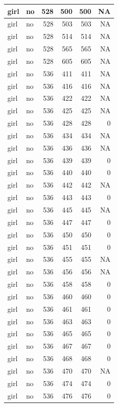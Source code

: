 \documentclass[man]{apa6}
\begin{document}
\begin{tabular}{l|l|r|r|r|r}
\hline
girl & no & 528 & 500 & 500 & NA\\
\hline
girl & no & 528 & 503 & 503 & NA\\
\hline
girl & no & 528 & 514 & 514 & NA\\
\hline
girl & no & 528 & 565 & 565 & NA\\
\hline
girl & no & 528 & 605 & 605 & NA\\
\hline
girl & no & 536 & 411 & 411 & NA\\
\hline
girl & no & 536 & 416 & 416 & NA\\
\hline
girl & no & 536 & 422 & 422 & NA\\
\hline
girl & no & 536 & 425 & 425 & NA\\
\hline
girl & no & 536 & 428 & 428 & 0\\
\hline
girl & no & 536 & 434 & 434 & NA\\
\hline
girl & no & 536 & 436 & 436 & NA\\
\hline
girl & no & 536 & 439 & 439 & 0\\
\hline
girl & no & 536 & 440 & 440 & 0\\
\hline
girl & no & 536 & 442 & 442 & NA\\
\hline
girl & no & 536 & 443 & 443 & 0\\
\hline
girl & no & 536 & 445 & 445 & NA\\
\hline
girl & no & 536 & 447 & 447 & 0\\
\hline
girl & no & 536 & 450 & 450 & 0\\
\hline
girl & no & 536 & 451 & 451 & 0\\
\hline
girl & no & 536 & 455 & 455 & NA\\
\hline
girl & no & 536 & 456 & 456 & NA\\
\hline
girl & no & 536 & 458 & 458 & 0\\
\hline
girl & no & 536 & 460 & 460 & 0\\
\hline
girl & no & 536 & 461 & 461 & 0\\
\hline
girl & no & 536 & 463 & 463 & 0\\
\hline
girl & no & 536 & 465 & 465 & 0\\
\hline
girl & no & 536 & 467 & 467 & 0\\
\hline
girl & no & 536 & 468 & 468 & 0\\
\hline
girl & no & 536 & 470 & 470 & NA\\
\hline
girl & no & 536 & 474 & 474 & 0\\
\hline
girl & no & 536 & 476 & 476 & 0\\

\end{tabular}
\end{document}

